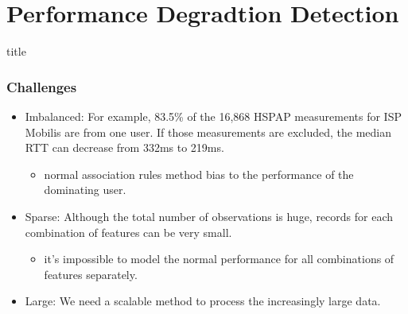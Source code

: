 \section{Performance Degradtion Detection}

\begin{frame}
    \vfill
    \centering
    \begin{beamercolorbox}[sep=8pt,center,shadow=true,rounded=true]{title}
    \insertsectionhead\par%
    \end{beamercolorbox}
    \vfill
\end{frame}

\begin{frame}
    \frametitle{Challenges}
    \begin{itemize}
        \item Imbalanced: For example, 83.5\% of the 16,868 HSPAP measurements for ISP Mobilis are from one user. If those measurements are excluded, the median RTT can decrease from 332ms to 219ms.
        \begin{itemize}
            \item normal association rules method bias to the performance of the dominating user.
        \end{itemize}
        \item Sparse: Although the total number of observations is huge, records for each combination of features can be very small.
        \begin{itemize}
            \item it's impossible to model the normal performance for all combinations of features separately.
        \end{itemize}
        \item Large: We need a scalable method to process the increasingly large data.
    \end{itemize}
\end{frame}

